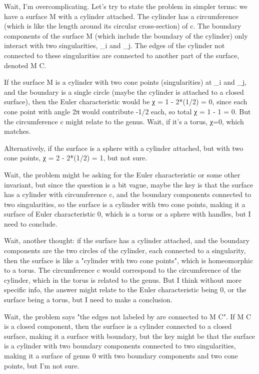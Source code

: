 Wait, I'm overcomplicating. Let's try to state the problem in simpler terms: we have a surface M with a cylinder attached. The cylinder has a circumference (which is like the length around its circular cross-section) of c. The boundary components of the surface M (which include the boundary of the cylinder) only interact with two singularities, _i and _j. The edges of the cylinder not connected to these singularities are connected to another part of the surface, denoted M C. 

If the surface M is a cylinder with two cone points (singularities) at _i and _j, and the boundary is a single circle (maybe the cylinder is attached to a closed surface), then the Euler characteristic would be χ = 1 - 2*(1/2) = 0, since each cone point with angle 2π would contribute -1/2 each, so total χ = 1 - 1 = 0. But the circumference c might relate to the genus. Wait, if it's a torus, χ=0, which matches. 

Alternatively, if the surface is a sphere with a cylinder attached, but with two cone points, χ = 2 - 2*(1/2) = 1, but not sure. 

Wait, the problem might be asking for the Euler characteristic or some other invariant, but since the question is a bit vague, maybe the key is that the surface has a cylinder with circumference c, and the boundary components connected to two singularities, so the surface is a cylinder with two cone points, making it a surface of Euler characteristic 0, which is a torus or a sphere with handles, but I need to conclude. 

Wait, another thought: if the surface has a cylinder attached, and the boundary components are the two circles of the cylinder, each connected to a singularity, then the surface is like a "cylinder with two cone points", which is homeomorphic to a torus. The circumference c would correspond to the circumference of the cylinder, which in the torus is related to the genus. But I think without more specific info, the answer might relate to the Euler characteristic being 0, or the surface being a torus, but I need to make a conclusion. 

Wait, the problem says "the edges not labeled by are connected to M C". If M C is a closed component, then the surface is a cylinder connected to a closed surface, making it a surface with boundary, but the key might be that the surface is a cylinder with two boundary components connected to two singularities, making it a surface of genus 0 with two boundary components and two cone points, but I'm not sure. 

